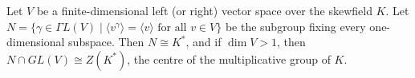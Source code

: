 Let $V$ be a finite-dimensional left (or right) vector space over the skewfield $K$. Let $N = \{\gamma \in \Gamma L(V) \mid \langle v^\gamma \rangle = \langle v \rangle \text{ for all } v \in V\}$ be the subgroup fixing every one-dimensional subspace. Then $N \cong K^*$, and if $\dim V > 1$, then $N \cap GL(V) \cong Z(K^*)$, the centre of the multiplicative group of $K$.
